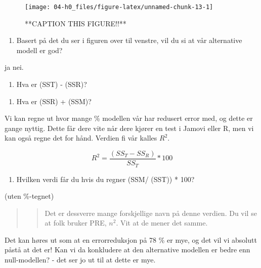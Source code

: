 \documentclass[
]{book}
\providecommand{\tightlist}{%
  \setlength{\itemsep}{0pt}\setlength{\parskip}{0pt}}
\begin{document}
\begin{figure}

{\centering \texttt{[image: 04-h0\_files/figure-latex/unnamed-chunk-13-1]} 

}

\caption{**CAPTION THIS FIGURE!!**}\label{fig:unnamed-chunk-13}
\end{figure}

\begin{enumerate}
\def\labelenumi{\alph{enumi}.}
\setcounter{enumi}{4}
\tightlist
\item
  Basert på det du ser i figuren over til venstre, vil du si at vår alternative modell er god?
\end{enumerate}

ja nei.

\begin{enumerate}
\def\labelenumi{\alph{enumi}.}
\setcounter{enumi}{3}
\tightlist
\item
  Hva er (SST) - (SSR)?
\end{enumerate}

\begin{enumerate}
\def\labelenumi{\alph{enumi}.}
\setcounter{enumi}{4}
\tightlist
\item
  Hva er (SSR) + (SSM)?
\end{enumerate}

Vi kan regne ut hvor mange \% modellen vår har redusert error med, og dette er gange nyttig. Dette får dere vite når dere kjører en test i Jamovi eller R, men vi kan også regne det for hånd. Verdien fi vår kalles \(R^2\).

\[
R^2 = \frac{(SS_T - SS_R)}{SS_T} * 100
\]

\begin{enumerate}
\def\labelenumi{\alph{enumi}.}
\setcounter{enumi}{4}
\tightlist
\item
  Hvilken verdi får du hvis du regner (SSM/ (SST)) * 100?
\end{enumerate}

(uten \%-tegnet)

\begin{quote}
\begin{quote}
Det er dessverre mange forskjellige navn på denne verdien. Du vil se at folk bruker PRE, \(n^2\). Vit at de mener det samme.
\end{quote}
\end{quote}

Det kan høres ut som at en errorreduksjon på 78 \% er mye, og det vil vi absolutt påstå at det er! Kan vi da konkludere at den alternative modellen er bedre enn null-modellen? - det ser jo ut til at dette er mye.
\end{document}
